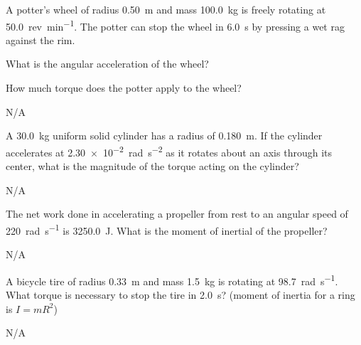 \begin{question}[ID=rotational-C-Q01,topic=rotational,difficulty=C]
    A potter’s wheel of radius \SI{0.50}{\meter} and mass
        \SI{100.0}{\kilo\gram} is freely rotating at \SI{50.0}{rev\per\minute}.
    The potter can stop the wheel in \SI{6.0}{\second} by pressing a
        wet rag against the rim.
    \begin{enumerate*}
        \item What is the angular acceleration of the wheel?
        \item How much torque does the potter apply to the wheel?
    \end{enumerate*}
\end{question}
\begin{solution}
    N/A
\end{solution}


\begin{question}[ID=rotational-C-Q02,topic=rotational,difficulty=C]
    A \SI{30.0}{\kilo\gram} uniform solid cylinder has a radius of \SI{0.180}{\meter}.
    If the cylinder accelerates at \SI{2.30e-2}{\radian\per\second\squared}
        as it rotates about an axis through its center,
        what is the magnitude of the torque acting on the cylinder?
\end{question}
\begin{solution}
    N/A
\end{solution}


\begin{question}[ID=rotational-C-Q03,topic=rotational,difficulty=C]
    The net work done in accelerating a propeller from rest to an
        angular speed of \SI{220}{\radian\per\second} is \SI{3250.0}{\joule}.
    What is the moment of inertial of the propeller?
\end{question}
\begin{solution}
    N/A
\end{solution}


\begin{question}[ID=rotational-C-Q04,topic=rotational,difficulty=C]
    A bicycle tire of radius \SI{0.33}{\meter} and mass \SI{1.5}{\kilo\gram}
        is rotating at \SI{98.7}{\radian\per\second}.
    What torque is necessary to stop the tire in \SI{2.0}{\second}? 
    (moment of inertia for a ring is $I=mR^2$)
\end{question}
\begin{solution}
    N/A
\end{solution}


\endinput

